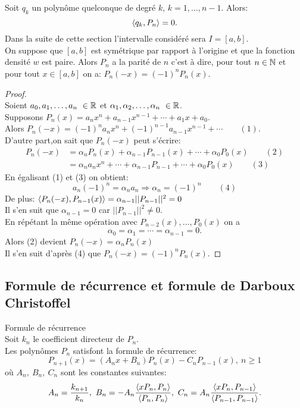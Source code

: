 \bprop
$ $\\
Soit  $ q_k $ un polynôme quelconque de degré $k$, $k=1,\dots,n-1$. Alors: $$ \langle q_k,P_n \rangle = 0.$$
\eprop
$ $\\$ $\\Dans la suite de cette section l'intervalle considéré sera $I=[a,b]$.
\bprop
$ $\\On suppose que $[a,b]$ est symétrique par rapport à l'origine et que la fonction densité $w$ est paire. Alors $P_n$ a la parité de $n$ c'est à dire, pour tout $ n \in \mathbb N $ et pour tout $ x \in [a,b]$ on a: $P_n(-x)=(-1)^n P_n(x)$.
\eprop

\begin{proof}
$ $\\
Soient $a_0,a_1,\dots,a_n \ \in \mathbb R$ et $\alpha_1,\alpha_2,\dots,\alpha_n\ \in \mathbb R$.
\\Supposons $P_n(x)=a_nx^n+a_{n-1}x^{n-1}+\cdots+a_1x+a_0$.
\\Alors $P_n(-x)=(-1)^n a_n x^n+(-1)^{n-1} a_{n-1} x^{n-1}+\cdots \phantom{1111} (1)$.
\\D'autre part,on sait que $P_n(-x)$ peut s'écrire:
\begin{align*}
P_n(-x)&=\alpha_n P_n(x)+\alpha_{n-1}P_{n-1}(x)+\cdots+\alpha_0 P_0(x) \phantom{1111} (2)\\
&=\alpha_n a_n x^n+\cdots+\alpha_{n-1}P_{n-1}+\cdots+\alpha_0 P_0(x) \phantom{1111} (3)
\end{align*}
En égalisant (1) et (3) on obtient:
$$a_n(-1)^n=\alpha_n a_n \Longrightarrow \alpha_n=(-1)^n \phantom{1111} (4)$$
De plus: $\langle P_n(-x),P_{n-1}(x) \rangle=\alpha_{n-1}||P_{n-1}||^2=0$
\\Il s'en suit que $\alpha_{n-1}=0$ car $||P_{n-1}||^2 \neq 0$.
\\En répétant la même opération avec $P_{n-2}(x),\dots,P_0(x)$ on a $$\alpha_0=\alpha_1=\cdots=\alpha_{n-1}=0.$$
Alors (2) devient $ P_n(-x)= \alpha_n P_n(x)$
\\Il s'en suit d'après (4) que $ P_n(-x)=(-1)^n P_n(x)$.   
\end{proof}


\subsection{Formule de récurrence et formule de Darboux Christoffel}

\bthm
Formule de récurrence
\\Soit $k_n$ le coefficient directeur de $P_n$.
\\ Les polynômes $P_n$ satisfont la formule de récurrence:
$$ P_{n+1}(x)= (A_n x+B_n)P_n(x) - C_n P_{n-1}(x),\ n \geqslant 1 $$
où $ A_n,\ B_n,\ C_n$ sont les constantes suivantes:
$$ A_n = \dfrac{k_{n+1}}{k_n}, \ B_n = -A_n \dfrac{\langle x P_n, P_n \rangle}{\langle P_n, P_n \rangle}, \ C_n=A_n \dfrac{\langle x P_n, P_{n-1} \rangle}{\langle P_{n-1}, P_{n-1} \rangle} .$$ 
\ethm

